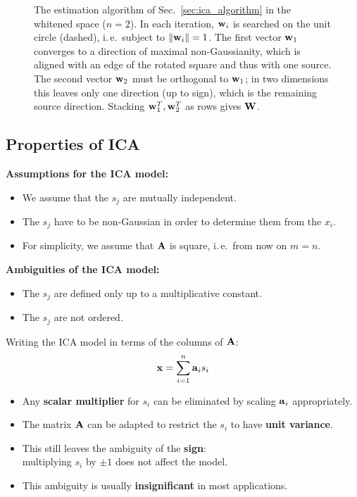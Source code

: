 \begin{figure}[htbp]
    \caption{The estimation algorithm of Sec.~\ref{sec:ica_algorithm} in the whitened space ($n=2$). In each iteration, $\bm{\mathrm{w}}_i$ is searched on the unit circle (dashed), i.\,e.\ subject to $\|\bm{\mathrm{w}}_i\|=1$. The first vector $\bm{\mathrm{w}}_1$ converges to a direction of maximal non-Gaussianity, which is aligned with an edge of the rotated square and thus with one source. The second vector $\bm{\mathrm{w}}_2$ must be orthogonal to $\bm{\mathrm{w}}_1$; in two dimensions this leaves only one direction (up to sign), which is the remaining source direction. Stacking $\bm{\mathrm{w}}_1^T,\bm{\mathrm{w}}_2^T$ as rows gives $\mathbf{W}$.}
    \label{fig:ica_deflation}
  \end{figure}
  
 
\subsection{Properties of ICA}
 \textbf {Assumptions for the ICA model:}
  \begin{itemize}
    \item We assume that the $s_j$ are mutually independent.            
    \item The $s_j$ have to be non-Gaussian in order to determine them from the $x_i$.
    \item For simplicity, we assume that $\mathbf{A}$ is square, i.\,e.\ from now on $m=n$.
  \end{itemize}
 \textbf {Ambiguities of the ICA model:}
  \begin{itemize} 
    \item The $s_j$ are defined only up to a multiplicative constant.
    \item The $s_j$ are not ordered.
  \end{itemize}
 Writing the ICA model in terms of the columns of $\mathbf{A}$:
  \begin{displaymath}
    \bm{\mathrm{x}} = \sum_{i=1}^n \bm{\mathrm{a}}_i s_i            
  \end{displaymath}
  
  \begin{itemize}
    \item Any \textbf        {scalar multiplier} for $s_i$ can be eliminated by scaling $\bm{\mathrm{a}}_i$ appropriately.            
    \item The matrix $\mathbf{A}$ can be adapted to restrict the $s_i$ to have \textbf        {unit variance}.            
    \item This still leaves the ambiguity of the \textbf        {sign}: \\
      multiplying $s_i$ by $\pm 1$ does not affect the model.            
    \item This ambiguity is usually \textbf        {insignificant} in most applications.
  \end{itemize}
 
